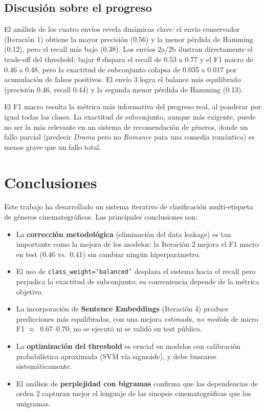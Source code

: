 \documentclass[11pt, a4paper]{article}
\begin{document}
\subsection{Discusión sobre el progreso}

El análisis de los cuatro envíos revela dinámicas clave: el envío conservador (Iteración 1) obtiene la mayor precisión (0.56) y la menor pérdida de Hamming (0.12), pero el recall más bajo (0.38). Los envíos 2a/2b ilustran directamente el trade-off del threshold: bajar $\theta$ dispara el recall de 0.53 a 0.77 y el F1 macro de 0.46 a 0.48, pero la exactitud de subconjunto colapsa de 0.035 a 0.017 por acumulación de falsos positivos. El envío 3 logra el balance más equilibrado (precisión 0.46, recall 0.44) y la segunda menor pérdida de Hamming (0.13).

El F1 macro resulta la métrica más informativa del progreso real, al ponderar por igual todas las clases. La exactitud de subconjunto, aunque más exigente, puede no ser la más relevante en un sistema de recomendación de géneros, donde un fallo parcial (predecir \textit{Drama} pero no \textit{Romance} para una comedia romántica) es menos grave que un fallo total.

\section{Conclusiones}

Este trabajo ha desarrollado un sistema iterativo de clasificación multi-etiqueta de géneros cinematográficos. Las principales conclusiones son:

\begin{itemize}
  \item La \textbf{corrección metodológica} (eliminación del data leakage) es tan importante como la mejora de los modelos: la Iteración 2 mejora el F1 macro en test (0.46 vs.\ 0.41) sin cambiar ningún hiperparámetro.
  \item El uso de \texttt{class\_weight='balanced'} desplaza el sistema hacia el recall pero perjudica la exactitud de subconjunto; su conveniencia depende de la métrica objetivo.
  \item La incorporación de \textbf{Sentence Embeddings} (Iteración 4) produce predicciones más equilibradas, con una mejora \emph{estimada, no medida} de micro F1 $\approx$~0.67--0.70; no se ejecutó ni se validó en test público.
  \item La \textbf{optimización del threshold} es crucial en modelos con calibración probabilística aproximada (SVM vía sigmoide), y debe buscarse sistemáticamente.
  \item El análisis de \textbf{perplejidad con bigramas} confirma que las dependencias de orden 2 capturan mejor el lenguaje de las sinopsis cinematográficas que los unigramas.
\end{itemize}
\end{document}
